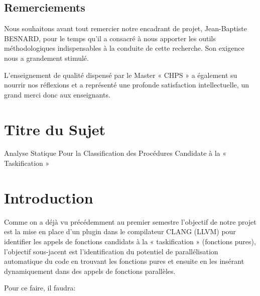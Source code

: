 \documentclass[12pt,titlepage]{article}
\begin{document}
\begin{center}
	\begin{minipage}{13cm}


\section*{ \huge \bfseries \center Remerciements}
Nous souhaitons avant tout remercier notre encadrant de projet, Jean-Baptiste BESNARD, pour le temps qu’il a consacré à nous apporter les outils méthodologiques indispensables à la conduite de cette recherche. Son exigence nous a grandement stimulé.

L’enseignement de qualité dispensé par le Master « CHPS » a également su nourrir nos réflexions et a représenté une profonde satisfaction intellectuelle, un grand merci donc aux enseignants.

	\end{minipage}
\end{center}





\pagebreak

\renewcommand*\contentsname{Sommaire}
\tableofcontents

\pagebreak

\section{Titre du Sujet}

Analyse Statique Pour la Classification des Procédures Candidate à la « Taskification »

\section{Introduction}

Comme on a déjà vu précédemment au premier semestre l'objectif de notre projet est la mise en place d’un plugin dans le compilateur CLANG (LLVM) pour identifier les appels de fonctions candidats à la « taskification » (fonctions pures), l'objectif sous-jacent est l'identification du potentiel de parallélisation automatique du code en trouvant les fonctions pures et ensuite en les insérant dynamiquement dans des appels de fonctions parallèles.

Pour ce faire, il faudra: 
\end{document}
